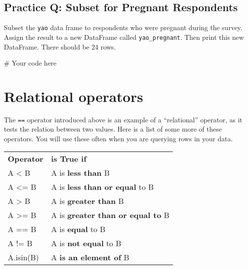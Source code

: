 \documentclass[
  letterpaper,
  DIV=11,
  numbers=noendperiod]{scrreprt}
\newenvironment{Shaded}{\begin{snugshade}}{\end{snugshade}}
\newcommand{\CommentTok}[1]{\textcolor[rgb]{0.37,0.37,0.37}{#1}}
\begin{document}
\begin{tcolorbox}[enhanced jigsaw, colframe=quarto-callout-tip-color-frame, opacityback=0, titlerule=0mm, bottomrule=.15mm, breakable, leftrule=.75mm, colbacktitle=quarto-callout-tip-color!10!white, title=\textcolor{quarto-callout-tip-color}{\faLightbulb}\hspace{0.5em}{Practice}, rightrule=.15mm, coltitle=black, opacitybacktitle=0.6, colback=white, left=2mm, arc=.35mm, toptitle=1mm, bottomtitle=1mm, toprule=.15mm]

\subsection{Practice Q: Subset for Pregnant
Respondents}\label{practice-q-subset-for-pregnant-respondents}

Subset the \texttt{yao} data frame to respondents who were pregnant
during the survey. Assign the result to a new DataFrame called
\texttt{yao\_pregnant}. Then print this new DataFrame. There should be
24 rows.

\begin{Shaded}
\begin{Highlighting}[]
\CommentTok{\# Your code here}
\end{Highlighting}
\end{Shaded}

\end{tcolorbox}

\section{Relational operators}\label{relational-operators}

The \texttt{==} operator introduced above is an example of a
``relational'' operator, as it tests the relation between two values.
Here is a list of some more of these operators. You will use these often
when you are querying rows in your data.

\begin{longtable}[]{@{}ll@{}}
\toprule\noalign{}
\endhead
\bottomrule\noalign{}
\endlastfoot
\textbf{Operator} & \textbf{is True if} \\
A \textless{} B & A is \textbf{less than} B \\
A \textless= B & A is \textbf{less than or equal} to B \\
A \textgreater{} B & A is \textbf{greater than} B \\
A \textgreater= B & A is \textbf{greater than or equal to} B \\
A == B & A is \textbf{equal} to B \\
A != B & A is \textbf{not equal} to B \\
A.isin(B) & A \textbf{is an element of} B \\
\end{longtable}
\end{document}

